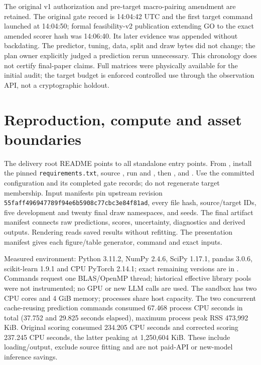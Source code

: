 \documentclass{article}
\begin{document}
The original v1 authorization and pre-target macro-pairing amendment are retained. The original gate record is 14:04:42 UTC and the first target command launched at 14:04:50; formal feasibility-v2 publication extending GO to the exact amended scorer hash was 14:06:40. Its later evidence was appended without backdating. The predictor, tuning, data, split and draw bytes did not change; the plan owner explicitly judged a prediction rerun unnecessary. This chronology does not certify final-paper claims. Full matrices were physically available for the initial audit; the target budget is enforced controlled use through the observation API, not a cryptographic holdout.

\section{Reproduction, compute and asset boundaries}\label{app:repro}
The delivery root README points to all standalone entry points. From , install the pinned \texttt{requirements.txt}, source , run  and , then ,  and . Use the committed configuration and its completed gate records; do not regenerate target membership. Input manifests pin upstream revision \texttt{55faff496947789f94e6b5908c77cbc3e84f81ad}, every file hash, source/target IDs, five development and twenty final draw namespaces, and seeds. The final artifact manifest connects raw predictions, scores, uncertainty, diagnostics and derived outputs. Rendering reads saved results without refitting. The presentation manifest gives each figure/table generator, command and exact inputs.

Measured environment: Python 3.11.2, NumPy 2.4.6, SciPy 1.17.1, pandas 3.0.6, scikit-learn 1.9.1 and CPU PyTorch 2.14.1; exact remaining versions are in . Commands request one BLAS/OpenMP thread; historical effective library pools were not instrumented; no GPU or new LLM calls are used. The sandbox has two CPU cores and 4 GiB memory; processes share host capacity. The two concurrent cache-reusing prediction commands consumed 67.468 process CPU seconds in total (37.752 and 29.825 seconds elapsed), maximum process peak RSS 473,992 KiB. Original scoring consumed 234.205 CPU seconds and corrected scoring 237.245 CPU seconds, the latter peaking at 1,250,604 KiB. These include loading/output, exclude source fitting and are not paid-API or new-model inference savings.
\end{document}
